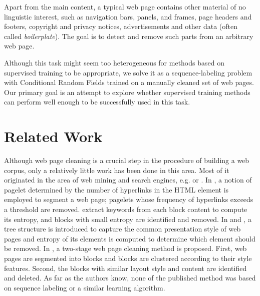 \documentclass[12pt,a4paper, fleqn, leqno, twoside]{article}
\begin{document}
Apart from the main content, a typical web page contains other material of no linguistic interest, such as  navigation bars, panels, and frames, page headers and footers, copyright and privacy notices, advertisements and other data (often called \textit{boilerplate}). The goal is to detect and remove such parts from an arbitrary web page.

Although this task might seem too heterogeneous for methods based on supervised training to be appropriate, we solve it as a sequence-labeling problem with Conditional Random Fields trained on a manually cleaned set of web pages. Our primary goal is an attempt to explore whether supervised training methods can perform well enough to be successfully used in this task.

\section{Related Work}

Although web page cleaning is a crucial step in the procedure of building a web corpus, only a relatively little work has been done in this area. Most of it originated in the area of web mining and search engines, e.g. \cite{Cooley1999} or \cite{Lee2000}. In \cite{Bar2002}, a notion of pagelet determined by the number of hyperlinks in the HTML element is employed to segment a web page; pagelets whose frequency of hyperlinks exceeds a threshold are removed. \cite{Lin2002} extract keywords from each block content to compute its entropy, and blocks with small entropy are identified and removed. In  \cite{Yi2003a} and \cite{Yi2003b}, a tree structure is introduced to capture the common presentation style of web pages and entropy of its elements is computed to determine which element should be removed.  In \cite{Chen2006}, a two-stage web page cleaning method is proposed. First, web pages are segmented into blocks and blocks are clustered according to their style features. Second, the blocks with similar layout style and content are identified and deleted. As far as the authors know, none of the published method was based on sequence labeling or a similar learning algorithm.

%
% 

\end{document}
